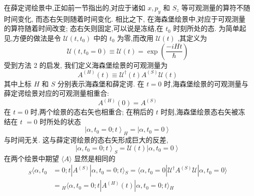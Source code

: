 在薛定谔绘景中,正如前一节指出的,对应于诸如 $x,{p}_{y}$ 和 ${S}_{z}$ 等可观测量的算符不随时间变化, 而态右矢则随着时间变化. 相比之下, 在海森堡绘景中,对应于可观测量的算符随着时间改变; 态右矢则固定,可以说是冻结,在 ${t}_{0}$ 时刻所处的态. 为简单起见,方便的做法是令 $\mathcal{U}\left( {t,{t}_{0}}\right)$ 中的 ${t}_{0}$ 为零,而改用 $\mathcal{U}\left( t\right)$ ,其定义为
\begin{equation}
	\mathcal{U}\left( {t,{t}_{0} = 0}\right) \equiv \mathcal{U}\left( t\right) = \exp \left( \frac{-{iHt}}{\hbar }\right)
\end{equation}
受到方法 2 的启发, 我们定义海森堡绘景的可观测量为
\begin{equation}\label{2.84}
	{A}^{\left( H\right) }\left( t\right) \equiv {\mathcal{U}}^{ \dagger }\left( t\right) {A}^{\left( S\right) }\mathcal{U}\left( t\right)
\end{equation}
其中上标 $H$ 和 $S$ 分别表示海森堡和薛定谔. 在 $t = 0$ 时,海森堡绘景的可观测量与薛定谔绘景对应的可观测量相重合:
\begin{equation}
	{A}^{\left( H\right) }\left( 0\right) = {A}^{\left( S\right) }
\end{equation}
在 $t = 0$ 时,两个绘景的态右矢也相重合; 在稍后的 $t$ 时刻,海森堡绘景态右矢被冻结在 $t$ $= 0$ 时所处的状态
\begin{equation}
	{\left| \alpha ,{t}_{0} = 0;t\right\rangle }_{H} = \left| {\alpha ,{t}_{0} = 0}\right\rangle
\end{equation}
与时间无关. 这与薛定谔绘景的态右矢形成巨大的反差,
\begin{equation}
	\left| {\alpha ,{t}_{0} = 0;t}\right\rangle_S = \mathcal{U}\left( t\right) \left| {\alpha ,{t}_{0} = 0}\right\rangle 
\end{equation}
在两个绘景中期望 $\langle A\rangle$ 显然是相同的
\begin{equation}
	\begin{aligned}
		{}_S\langle \alpha ,{t}_{0} &= 0;t| {A}^{\left( S\right) }| \alpha ,{t}_{0} = 0;t\rangle {}_S = \langle {\alpha ,{t}_{0} = 0 | {\mathcal{U}}^{ \dagger }{A}^{\left( S\right) }\mathcal{U} | \alpha,{t}_{0} = 0}\rangle\\
		&= {}_{H}\langle {\alpha ,{t}_{0} = 0;t| {{A}^{\left( H\right) }\left( t\right) }| \alpha ,{t}_{0} = 0;t}\rangle {}_{H}
	\end{aligned}
\end{equation}
